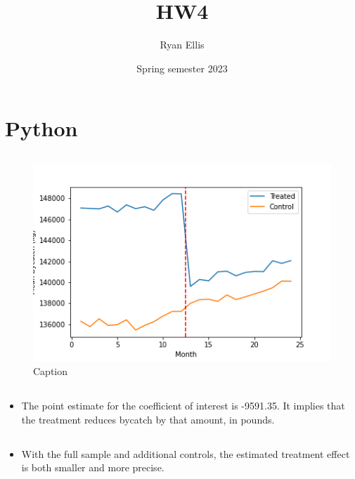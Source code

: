 \documentclass{article}
\title{HW4}
\author{Ryan Ellis}
\date{Spring semester 2023}
\begin{document}
  
\maketitle

\section{Python}
\subsection{}
\begin{figure}[hbt!]
    \centering
    \includegraphics[scale=0.9]{homework4/output/image1.png}
    \caption{Caption}
    \label{fig:my_label}
\end{figure}

\subsection{}
\begin{itemize}
    \item The point estimate for the coefficient of interest is -9591.35. It implies that the treatment reduces bycatch by that amount, in pounds. 
\end{itemize}

\clearpage
\subsection{}

\begin{table}[hbt!] \centering

\end{table}


\begin{itemize}
    \item With the full sample and additional controls, the estimated treatment effect is both smaller and more precise.
\end{itemize}
\clearpage
\end{document}
